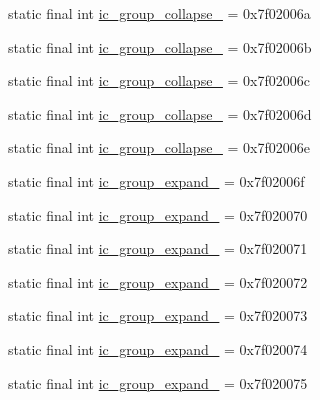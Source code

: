 \begin{CompactItemize}
\item 
static final int \hyperlink{classandroid_1_1support_1_1graphics_1_1drawable_1_1_r_1_1drawable_d9d643868ed69f6950f5e8e0310416f5}{ic\_\-group\_\-collapse\_} = 0x7f02006a
\item 
static final int \hyperlink{classandroid_1_1support_1_1graphics_1_1drawable_1_1_r_1_1drawable_65ccf4075885b05f773b35538642107c}{ic\_\-group\_\-collapse\_} = 0x7f02006b
\item 
static final int \hyperlink{classandroid_1_1support_1_1graphics_1_1drawable_1_1_r_1_1drawable_279bf0749b5db5b28060b7435b5e2d32}{ic\_\-group\_\-collapse\_} = 0x7f02006c
\item 
static final int \hyperlink{classandroid_1_1support_1_1graphics_1_1drawable_1_1_r_1_1drawable_11732773e722fd5eeeee856f6f82cbe1}{ic\_\-group\_\-collapse\_} = 0x7f02006d
\item 
static final int \hyperlink{classandroid_1_1support_1_1graphics_1_1drawable_1_1_r_1_1drawable_9481145250b53a6ca33fd76de63ab2d3}{ic\_\-group\_\-collapse\_} = 0x7f02006e
\item 
static final int \hyperlink{classandroid_1_1support_1_1graphics_1_1drawable_1_1_r_1_1drawable_c07c1f07515b09c481cd8f30a7371ca8}{ic\_\-group\_\-expand\_} = 0x7f02006f
\item 
static final int \hyperlink{classandroid_1_1support_1_1graphics_1_1drawable_1_1_r_1_1drawable_db253220c94cb667c53ec5206786750c}{ic\_\-group\_\-expand\_} = 0x7f020070
\item 
static final int \hyperlink{classandroid_1_1support_1_1graphics_1_1drawable_1_1_r_1_1drawable_f874603222c39522afad721d89794e0a}{ic\_\-group\_\-expand\_} = 0x7f020071
\item 
static final int \hyperlink{classandroid_1_1support_1_1graphics_1_1drawable_1_1_r_1_1drawable_d85b36f8ab75d6daaf2f1d84fedc195a}{ic\_\-group\_\-expand\_} = 0x7f020072
\item 
static final int \hyperlink{classandroid_1_1support_1_1graphics_1_1drawable_1_1_r_1_1drawable_dd0f5056de8f7f0c8ca5c48b7d17c8d8}{ic\_\-group\_\-expand\_} = 0x7f020073
\item 
static final int \hyperlink{classandroid_1_1support_1_1graphics_1_1drawable_1_1_r_1_1drawable_fd08cdff4919e3343f34023d84a6b906}{ic\_\-group\_\-expand\_} = 0x7f020074
\item 
static final int \hyperlink{classandroid_1_1support_1_1graphics_1_1drawable_1_1_r_1_1drawable_fe601109616c2aa7138a64966905156b}{ic\_\-group\_\-expand\_} = 0x7f020075

\end{CompactItemize}
